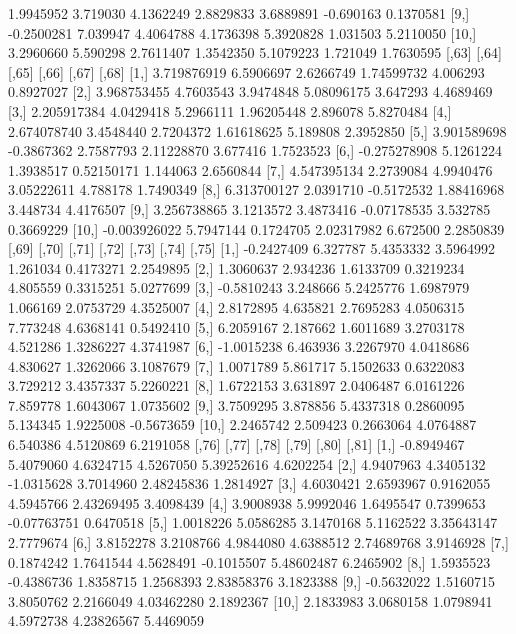 \documentclass[12pt]{article}
\begin{document}
\begin{Schunk}
\begin{Soutput}
 [8,]  1.9945952 3.719030  4.1362249 2.8829833  3.6889891 -0.690163 0.1370581
 [9,] -0.2500281 7.039947  4.4064788 4.1736398  5.3920828  1.031503 5.2110050
[10,]  3.2960660 5.590298  2.7611407 1.3542350  5.1079223  1.721049 1.7630595
             [,63]      [,64]      [,65]       [,66]    [,67]     [,68]
 [1,]  3.719876919  6.5906697  2.6266749  1.74599732 4.006293 0.8927027
 [2,]  3.968753455  4.7603543  3.9474848  5.08096175 3.647293 4.4689469
 [3,]  2.205917384  4.0429418  5.2966111  1.96205448 2.896078 5.8270484
 [4,]  2.674078740  3.4548440  2.7204372  1.61618625 5.189808 2.3952850
 [5,]  3.901589698 -0.3867362  2.7587793  2.11228870 3.677416 1.7523523
 [6,] -0.275278908  5.1261224  1.3938517  0.52150171 1.144063 2.6560844
 [7,]  4.547395134  2.2739084  4.9940476  3.05222611 4.788178 1.7490349
 [8,]  6.313700127  2.0391710 -0.5172532  1.88416968 3.448734 4.4176507
 [9,]  3.256738865  3.1213572  3.4873416 -0.07178535 3.532785 0.3669229
[10,] -0.003926022  5.7947144  0.1724705  2.02317982 6.672500 2.2850839
           [,69]    [,70]     [,71]     [,72]    [,73]     [,74]      [,75]
 [1,] -0.2427409 6.327787 5.4353332 3.5964992 1.261034 0.4173271  2.2549895
 [2,]  1.3060637 2.934236 1.6133709 0.3219234 4.805559 0.3315251  5.0277699
 [3,] -0.5810243 3.248666 5.2425776 1.6987979 1.066169 2.0753729  4.3525007
 [4,]  2.8172895 4.635821 2.7695283 4.0506315 7.773248 4.6368141  0.5492410
 [5,]  6.2059167 2.187662 1.6011689 3.2703178 4.521286 1.3286227  4.3741987
 [6,] -1.0015238 6.463936 3.2267970 4.0418686 4.830627 1.3262066  3.1087679
 [7,]  1.0071789 5.861717 5.1502633 0.6322083 3.729212 3.4357337  5.2260221
 [8,]  1.6722153 3.631897 2.0406487 6.0161226 7.859778 1.6043067  1.0735602
 [9,]  3.7509295 3.878856 5.4337318 0.2860095 5.134345 1.9225008 -0.5673659
[10,]  2.2465742 2.509423 0.2663064 4.0764887 6.540386 4.5120869  6.2191058
           [,76]      [,77]      [,78]      [,79]       [,80]     [,81]
 [1,] -0.8949467  5.4079060  4.6324715  4.5267050  5.39252616 4.6202254
 [2,]  4.9407963  4.3405132 -1.0315628  3.7014960  2.48245836 1.2814927
 [3,]  4.6030421  2.6593967  0.9162055  4.5945766  2.43269495 3.4098439
 [4,]  3.9008938  5.9992046  1.6495547  0.7399653 -0.07763751 0.6470518
 [5,]  1.0018226  5.0586285  3.1470168  5.1162522  3.35643147 2.7779674
 [6,]  3.8152278  3.2108766  4.9844080  4.6388512  2.74689768 3.9146928
 [7,]  0.1874242  1.7641544  4.5628491 -0.1015507  5.48602487 6.2465902
 [8,]  1.5935523 -0.4386736  1.8358715  1.2568393  2.83858376 3.1823388
 [9,] -0.5632022  1.5160715  3.8050762  2.2166049  4.03462280 2.1892367
[10,]  2.1833983  3.0680158  1.0798941  4.5972738  4.23826567 5.4469059

\end{Soutput}
\end{Schunk}
\end{document}
